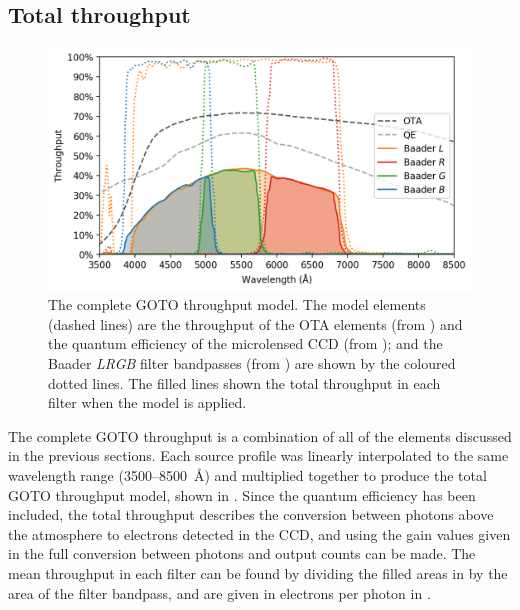 
\subsection{Total throughput}
\label{sec:total_throughput}
\begin{colsection}

\begin{figure}[t]
    \begin{center}
        \includegraphics[width=\linewidth]{images/throughput/throughput.png}
    \end{center}
    \caption[Complete throughput model for the GOTO filters]{
        The complete GOTO throughput model. The model elements (dashed lines) are the throughput of the OTA elements (from ) and the quantum efficiency of the microlensed CCD (from ); and the Baader \textit{LRGB} filter bandpasses (from ) are shown by the coloured dotted lines. The filled lines shown the total throughput in each filter when the model is applied.
    }\label{fig:throughput}
\end{figure}

The complete GOTO throughput is a combination of all of the elements discussed in the previous sections. Each source profile was linearly interpolated to the same wavelength range (3500--\SI{8500}{\angstrom}) and multiplied together to produce the total GOTO throughput model, shown in . Since the quantum efficiency has been included, the total throughput describes the conversion between photons above the atmosphere to electrons detected in the CCD, and using the gain values given in  the full conversion between photons and output counts can be made. The mean throughput in each filter can be found by dividing the filled areas in  by the area of the filter bandpass, and are given in electrons per photon in .

\newpage

\end{colsection}

